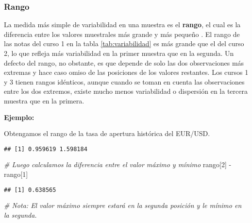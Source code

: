 \documentclass[
]{book}
\newenvironment{Shaded}{\begin{snugshade}}{\end{snugshade}}
\newcommand{\AttributeTok}[1]{\textcolor[rgb]{0.77,0.63,0.00}{#1}}
\newcommand{\CommentTok}[1]{\textcolor[rgb]{0.56,0.35,0.01}{\textit{#1}}}
\newcommand{\DecValTok}[1]{\textcolor[rgb]{0.00,0.00,0.81}{#1}}
\newcommand{\FunctionTok}[1]{\textcolor[rgb]{0.00,0.00,0.00}{#1}}
\newcommand{\NormalTok}[1]{#1}
\newcommand{\SpecialCharTok}[1]{\textcolor[rgb]{0.00,0.00,0.00}{#1}}
\begin{document}
\hypertarget{rango}{%
\subsubsection*{Rango}\label{rango}}

La medida más simple de variabilidad en una muestra es el \textbf{rango}, el cual es la diferencia entre los valores muestrales más grande y más pequeño \citep[página 32]{Devore}. El rango de las notas del curso 1 en la tabla \ref{tab:variabilidad} es más grande que el del curso 2, lo que refleja más variabilidad en la primer muestra que en la segunda. Un defecto del rango, no obstante, es que depende de solo las dos observaciones más extremas y hace caso omiso de las posiciones de los valores restantes. Los cursos 1 y 3 tienen rangos idénticos, aunque cuando se toman en cuenta las observaciones entre los dos extremos, existe mucho menos variabilidad o dispersión en la tercera muestra que en la primera.

\textbf{Ejemplo:}

Obtengamos el rango de la tasa de apertura histórica del EUR/USD.

\begin{Shaded}
\end{Shaded}

\begin{verbatim}
## [1] 0.959619 1.598184
\end{verbatim}

\begin{Shaded}
\begin{Highlighting}[]
\CommentTok{\# Luego calculamos la diferencia entre el valor máximo y mínimo}
\NormalTok{rango[}\DecValTok{2}\NormalTok{] }\SpecialCharTok{{-}}\NormalTok{ rango[}\DecValTok{1}\NormalTok{]}
\end{Highlighting}
\end{Shaded}

\begin{verbatim}
## [1] 0.638565
\end{verbatim}

\begin{Shaded}
\begin{Highlighting}[]
\CommentTok{\# Nota: El valor máximo siempre estará en la segunda posición y le mínimo en la segunda.}
\end{Highlighting}
\end{Shaded}
\end{document}
